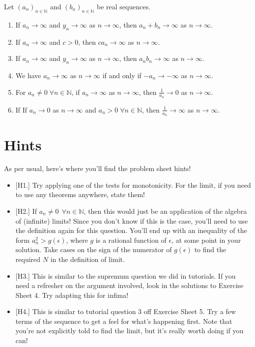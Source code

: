 \documentclass[
  10pt,
  a4paper]{article}
\providecommand{\tightlist}{%
  \setlength{\itemsep}{0pt}\setlength{\parskip}{0pt}}
\theoremstyle{plain}
\theoremstyle{plain}
\theoremstyle{plain}
\theoremstyle{plain}
\theoremstyle{plain}
\theoremstyle{definition}
\theoremstyle{definition}
\theoremstyle{definition}
\theoremstyle{remark}
\let\BeginKnitrBlock\begin \let\EndKnitrBlock\end
\begin{document}
\BeginKnitrBlock{theorem}[Algebra of Infinite Limits]
{\label{thm:thm4} }Let \((a_n)_{n\in\mathbb{N}}\) and \((b_n)_{n\in\mathbb{N}}\) be real sequences.

\begin{enumerate}
\def\labelenumi{\arabic{enumi}.}
\tightlist
\item
  If \(a_n \to \infty\) and \(y_n \to \infty\) as \(n \to \infty\), then \(a_n + b_n \to \infty\) as \(n\to\infty\).
\item
  If \(a_n \to \infty\) and \(c > 0\), then \(ca_n \to \infty\) as \(n \to \infty\).
\item
  If \(a_n \to \infty\) and \(y_n \to \infty\) as \(n \to \infty\), then \(a_nb_n \to \infty\) as \(n\to\infty\).
\item
  We have \(a_n \to \infty\) as \(n \to \infty\) if and only if \(-a_n \to -\infty\) as \(n \to \infty\).
\item
  For \(a_n \neq 0\; \forall n \in \mathbb{N}\), if \(a_n \to \infty\) as \(n \to \infty\), then \(\frac{1}{a_n} \to 0\) as \(n \to \infty\).
\item
  If If \(a_n \to 0\) as \(n\to\infty\) and \(a_n > 0\; \forall n \in \mathbb{N}\), then \(\frac{1}{a_n} \to \infty\) as \(n \to \infty\).
\end{enumerate}
\EndKnitrBlock{theorem}

\hypertarget{hints}{%
\section{Hints}\label{hints}}

As per usual, here's where you'll find the problem sheet hints!

\begin{itemize}
\tightlist
\item
  {[}H1.{]} Try applying one of the tests for monotonicity. For the limit, if you need to use any theorems anywhere, state them!
\item
  {[}H2.{]} If \(a_n \neq 0 \, \; \forall n \in \mathbb{N}\), then this would just be an application of the algebra of (infinite) limits! Since you don't know if this is the case, you'll need to use the definition again for this question. You'll end up with an inequality of the form \(a_n^2 > g(\epsilon)\), where \(g\) is a rational function of \(\epsilon\), at some point in your solution. Take cases on the sign of the numerator of \(g(\epsilon)\) to find the required \(N\) in the definition of limit.
\item
  {[}H3.{]} This is similar to the supremum question we did in tutorials. If you need a refresher on the argument involved, look in the solutions to Exercise Sheet 4. Try adapting this for infima!
\item
  {[}H4.{]} This is similar to tutorial question 3 off Exercise Sheet 5. Try a few terms of the sequence to get a feel for what's happening first. Note that you're not explicitly told to find the limit, but it's really worth doing if you can!
\end{itemize}
\end{document}
